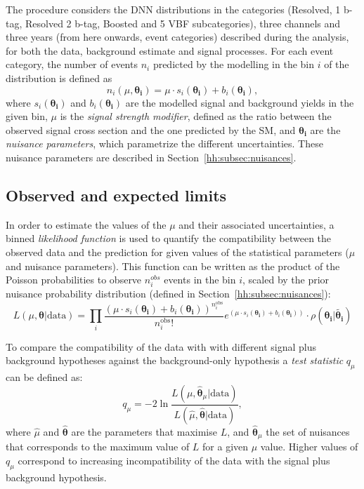 \documentclass[../main.tex]{subfiles}
\begin{document}
The procedure considers the DNN distributions in the categories (Resolved, 1 b-tag, Resolved 2 b-tag, Boosted and 5 VBF subcategories), three channels and three years (from here onwards, event categories) described during the analysis, for both the data, background estimate and signal processes. For each event category, the number of events $n_i$ predicted by the modelling in the bin $i$ of the distribution is defined as
\begin{equation}
n_i(\mu, \boldsymbol{\theta_i})=\mu\cdot s_i (\boldsymbol{\theta_i}) + b_i(\boldsymbol{\theta_i}),
\end{equation}
where $s_i (\boldsymbol{\theta_i})$ and $b_i(\boldsymbol{\theta_i})$ are the modelled signal and background yields in the given bin, $\mu$ is the \textit{signal strength modifier}, defined as the ratio between the observed signal cross section and the one predicted by the SM, and $\boldsymbol{\theta_i}$ are the \textit{nuisance parameters}, which parametrize the different uncertainties. These nuisance parameters are described in Section~\ref{hh:subsec:nuisances}.

\subsection{Observed and expected limits}

In order to estimate the values of the $\mu$ and their associated uncertainties, a binned \textit{likelihood function} is used to quantify the compatibility between the observed data and the prediction for given values of the statistical parameters ($\mu$ and nuisance parameters). This function can be written as the product of the Poisson probabilities to observe $n_i^{obs}$ events in the bin $i$, scaled by the prior nuisance probability distribution (defined in Section~\ref{hh:subsec:nuisances}):
\begin{equation}
L(\mu, \boldsymbol{\theta} | \text{data}) = \prod_i \frac{\left(\mu\cdot s_i (\boldsymbol{\theta_i}) + b_i(\boldsymbol{\theta_i}) \right)^{n_i^\text{obs}}}{n_i^\text{obs}!}e^{(\mu\cdot s_i (\boldsymbol{\theta_i}) + b_i(\boldsymbol{\theta_i}))} \cdot \rho(\boldsymbol{\theta_i}|\boldsymbol{\tilde{\theta_i}})
\end{equation}

To compare the compatibility of the data with  with different signal plus background hypotheses against the background-only hypothesis a \textit{test statistic} $q_\mu$ can be defined as:
\begin{equation}
q_\mu = -2 \ln \frac{L(\mu, \boldsymbol{\hat{\theta}}_\mu | \text{data})}{L(\hat{\mu}, \boldsymbol{\hat{\theta}} | \text{data})},
\end{equation}
where $\hat{\mu}$ and $\boldsymbol{\hat{\theta}}$ are the parameters that maximise $L$, and $\boldsymbol{\hat{\theta}}_\mu$ the set of nuisances that corresponds to the maximum value of $L$ for a given $\mu$ value. Higher values of $q_\mu$ correspond to increasing incompatibility of the data with the signal plus background hypothesis.
\end{document}
